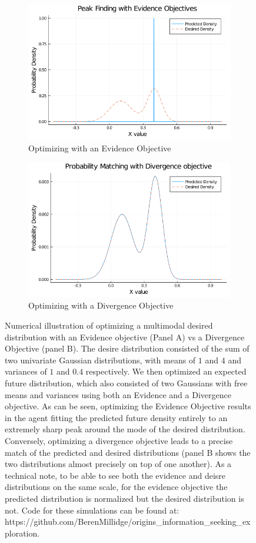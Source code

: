 \begin{figure}[H]
\centering
\begin{subfigure}{.5\textwidth}
  \centering
  \includegraphics[width=.9\linewidth]{chapter_5_figures/evidence.png}
  \caption{Optimizing with an Evidence Objective}
\end{subfigure}%
\begin{subfigure}{.5\textwidth}
  \centering
  \includegraphics[width=.9\linewidth]{chapter_5_figures/divergence.png}
  \caption{Optimizing with a Divergence Objective}
\end{subfigure}
\caption{Numerical illustration of optimizing a multimodal desired distribution with an Evidence objective (Panel A) vs a Divergence Objective (panel B). The desire distribution consisted of the sum of two univariate Gaussian distributions, with means of $1$ and $4$ and variances of $1$ and $0.4$ respectively. We then optimized an expected future distribution, which also consisted of two Gaussians with free means and variances using both an Evidence and a Divergence objective. As can be seen, optimizing the Evidence Objective results in the agent fitting the predicted future density entirely to an extremely sharp peak around the mode of the desired distribution. Conversely, optimizing a divergence objective leads to a precise match of the predicted and desired distributions (panel B shows the two distributions almost precisely on top of one another). As a technical note, to be able to see both the evidence and deisre distributions on the same scale, for the evidence objective the predicted distribution is normalized but the desired distribution is not. Code for these simulations can be found at: https://github.com/BerenMillidge/origins\_information\_seeking\_exploration.}
\end{figure}

